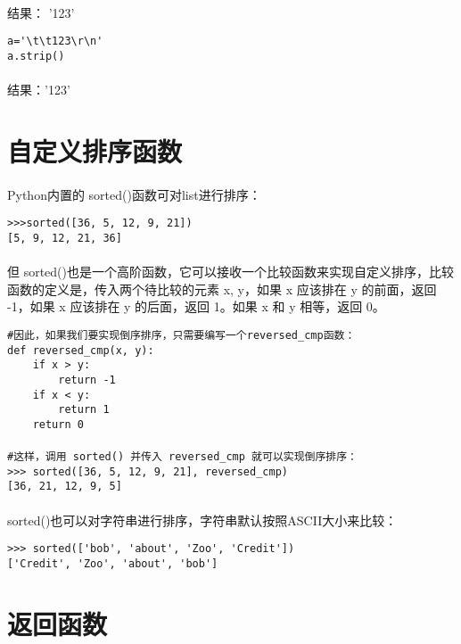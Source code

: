 \documentclass{article}
\begin{document}
\begin{CJK}{UTF8}{gbsn}
\paragraph{}
结果： '123'
\begin{verbatim}
a='\t\t123\r\n'
a.strip()
\end{verbatim}
\paragraph{}
结果：'123'
\section{自定义排序函数}
\paragraph{}
Python内置的 sorted()函数可对list进行排序：
\begin{verbatim}
>>>sorted([36, 5, 12, 9, 21])
[5, 9, 12, 21, 36]
\end{verbatim}
\paragraph{}
但 sorted()也是一个高阶函数，它可以接收一个比较函数来实现自定义排序，比较函数的定义是，传入两个待比较的元素 x, y，如果 x 应该排在 y 的前面，返回 -1，如果 x 应该排在 y 的后面，返回 1。如果 x 和 y 相等，返回 0。
\begin{verbatim}
#因此，如果我们要实现倒序排序，只需要编写一个reversed_cmp函数：
def reversed_cmp(x, y):
    if x > y:
        return -1
    if x < y:
        return 1
    return 0
\end{verbatim}
\paragraph{}
\begin{verbatim}
#这样，调用 sorted() 并传入 reversed_cmp 就可以实现倒序排序：
>>> sorted([36, 5, 12, 9, 21], reversed_cmp)
[36, 21, 12, 9, 5]
\end{verbatim}
\paragraph{}
sorted()也可以对字符串进行排序，字符串默认按照ASCII大小来比较：
\begin{verbatim}
>>> sorted(['bob', 'about', 'Zoo', 'Credit'])
['Credit', 'Zoo', 'about', 'bob']
\end{verbatim}
\section{返回函数}

\end{CJK}
\end{document}
